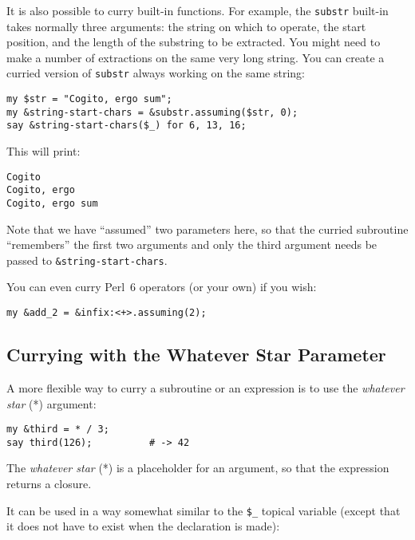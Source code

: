 It is also possible to curry built-in functions. For example, 
the {\tt substr} built-in takes normally three arguments:
the string on which to operate, the start position, and the 
length of the substring to be extracted. You might need 
to make a number of extractions on the same very long 
string. You can create a curried version of {\tt substr} 
always working on the same string:

\begin{verbatim}
my $str = "Cogito, ergo sum";                     
my &string-start-chars = &substr.assuming($str, 0);
say &string-start-chars($_) for 6, 13, 16; 
\end{verbatim}

This will print:

\begin{verbatim}
Cogito
Cogito, ergo
Cogito, ergo sum
\end{verbatim}

Note that we have ``assumed'' two parameters here, so 
that the curried subroutine ``remembers'' the first 
two arguments and only the third argument needs be 
passed to \verb'&string-start-chars'.

You can even curry Perl~6 operators (or your own) if 
you wish:

\begin{verbatim}
my &add_2 = &infix:<+>.assuming(2);
\end{verbatim}

\subsection{Currying with the Whatever Star Parameter}
\label{whatever star parameter}

A more flexible way to curry a subroutine or an expression 
is to use the \emph{whatever star} (*) argument:

\begin{verbatim}
my &third = * / 3; 
say third(126);          # -> 42
\end{verbatim}

The \emph{whatever star} (*) is a placeholder for 
an argument, so that the expression returns 
a closure.

It can be used in a way somewhat similar to the \verb'$_' 
topical variable (except that it does not have to exist 
when the declaration is made):

